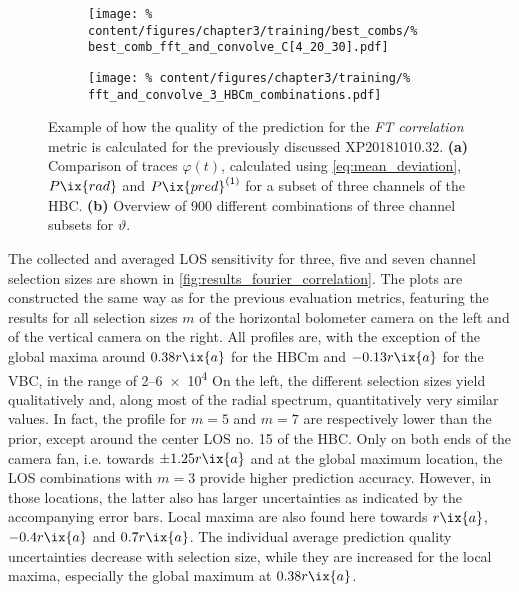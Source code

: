         \begin{figure}[t]%
            \centering%
            \begin{subfigure}{0.43\textwidth}%
                \texttt{[image: \%
                    content/figures/chapter3/training/best\_combs/\%
                    best\_comb\_fft\_and\_convolve\_C[4\_20\_30].pdf]}%
                \caption{}%
            \end{subfigure}%
            \hfill%
            \begin{subfigure}{0.47\textwidth}%
                \texttt{[image: \%
                    content/figures/chapter3/training/\%
                    fft\_and\_convolve\_3\_HBCm\_combinations.pdf]}%
                \caption{}%
            \end{subfigure}%
            \caption{Example of how the quality of the prediction for the \textit{FT correlation} metric is calculated for the previously discussed XP20181010.32. \textbf{(a)} Comparison of traces $\varphi\left(t\right)$, calculated using \cref{eq:mean_deviation}, $P\ix{rad}$ and $P\ix{pred}^{\left(1\right)}$ for a subset of three channels of the HBC. \textbf{(b)} Overview of 900 different combinations of three channel subsets for $\vartheta$.}\label{fig:fourier_correlation}%
        \end{figure}%
%
        The collected and averaged LOS sensitivity for three, five and seven channel selection sizes are shown in \cref{fig:results_fourier_correlation}. The plots are constructed the same way as for the previous evaluation metrics, featuring the results for all selection sizes $m$ of the horizontal bolometer camera on the left and of the vertical camera on the right. All profiles are, with the exception of the global maxima around $0.38r\ix{a}$ for the HBCm and $-0.13r\ix{a}$ for the VBC, in the range of \SIrange{2}{6e4}{\arbitraryunit} On the left, the different selection sizes yield qualitatively and, along most of the radial spectrum, quantitatively very similar values. In fact, the profile for $m=5$ and $m=7$ are respectively lower than the prior, except around the center LOS no. 15 of the HBC. Only on both ends of the camera fan, i.e. towards $\pm1.25r\ix{a}$ and at the global maximum location, the LOS combinations with $m=3$ provide higher prediction accuracy. However, in those locations, the latter also has larger uncertainties as indicated by the accompanying error bars. Local maxima are also found here towards $r\ix{a}$, $-0.4r\ix{a}$ and $0.7r\ix{a}$. The individual average prediction quality uncertainties decrease with selection size, while they are increased for the local maxima, especially the global maximum at $0.38r\ix{a}$.\\%
